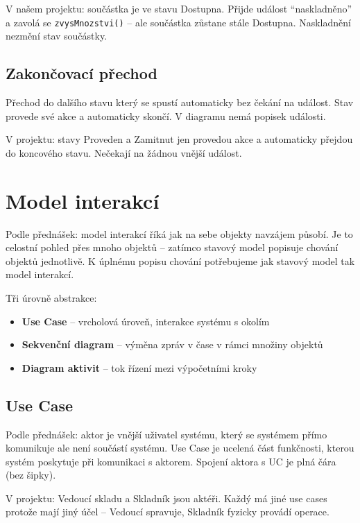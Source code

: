 \documentclass[12pt, a4paper]{article}
\begin{document}
V našem projektu: součástka je ve stavu Dostupna. Přijde událost ``naskladněno'' a zavolá se \texttt{zvysMnozstvi()} -- ale součástka zůstane stále Dostupna. Naskladnění nezmění stav součástky.

\subsection{Zakončovací přechod}

Přechod do dalšího stavu který se spustí automaticky bez čekání na událost. Stav provede své akce a automaticky skončí. V diagramu nemá popisek události.

V projektu: stavy Proveden a Zamitnut jen provedou akce a automaticky přejdou do koncového stavu. Nečekají na žádnou vnější událost.

\section{Model interakcí}

Podle přednášek: model interakcí říká jak na sebe objekty navzájem působí. Je to celostní pohled přes mnoho objektů -- zatímco stavový model popisuje chování objektů jednotlivě. K úplnému popisu chování potřebujeme jak stavový model tak model interakcí.

Tři úrovně abstrakce:
\begin{itemize}
  \item \textbf{Use Case} -- vrcholová úroveň, interakce systému s okolím
  \item \textbf{Sekvenční diagram} -- výměna zpráv v čase v rámci množiny objektů
  \item \textbf{Diagram aktivit} -- tok řízení mezi výpočetními kroky
\end{itemize}

\subsection{Use Case}

Podle přednášek: aktor je vnější uživatel systému, který se systémem přímo komunikuje ale není součástí systému. Use Case je ucelená část funkčnosti, kterou systém poskytuje při komunikaci s aktorem. Spojení aktora s UC je plná čára (bez šipky).

V projektu: Vedoucí skladu a Skladník jsou aktéři. Každý má jiné use cases protože mají jiný účel -- Vedoucí spravuje, Skladník fyzicky provádí operace.
\end{document}
